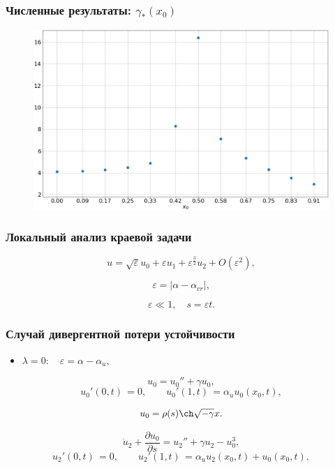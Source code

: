 \documentclass[fullscreen=true, unicode, bookmarks=false]{beamer}
\begin{document}
\begin{frame}
\frametitle{ Численные результаты: $ \gamma_*(x_0) $ }

\begin{figure} 
\includegraphics[scale=0.4]{x0-gamma_star.png}  
\end{figure}

\end{frame}

\begin{frame}
\frametitle{ Локальный анализ краевой задачи }

\begin{equation}
	u = \sqrt{\varepsilon}u_0 + \varepsilon u_1 + \varepsilon^{\frac{3}{2}} u_2 + O(\varepsilon^2),
\end{equation}

\bigskip

$$ \varepsilon = | \alpha - \alpha_{cr} |, $$

$$ \varepsilon \ll 1, \quad s = \varepsilon t. $$

\end{frame}

\begin{frame}
\frametitle{ Случай дивергентной потери устойчивости }

\begin{itemize}
\item { $ \lambda = 0: \quad \varepsilon=\alpha-\alpha_u, $
}
\end{itemize}

\medskip

\begin{equation}
	u_0 = u_0'' + \gamma u_0,
\end{equation}
\begin{equation}
	u_0'(0, t) \, = 0, \qquad u_0'(1, t) \, = \alpha_u u_0(x_0, t),
\end{equation}

$$ u_0 = \rho(s) \ch \sqrt{-\gamma} x. $$

\medskip

\begin{equation}
	\dot u_2 + \frac{\partial u_0}{\partial s} = u_2'' + \gamma u_2 - u_0^3,
\end{equation}
\begin{equation}
	u_2'(0, t) \, = 0, \qquad u_2'(1, t) \, = \alpha_u u_2(x_0, t) + u_0(x_0, t),
\end{equation}

\end{frame}
\end{document}
